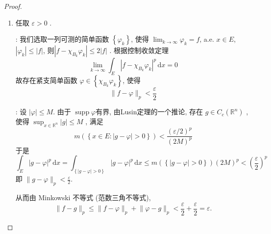 \documentclass[../main.tex]{subfiles}
\begin{document}
\begin{proof}
    \begin{enumerate}
        \item 
        
        任取 \(   \varepsilon > 0  \) .
        
        : 我们选取一列可测的简单函数 \(  \left\{  \varphi _{k} \right\}  \), 使得 \(  \lim_{k\to \infty} \varphi _{k}= f  \), a.e. \(  x \in E  \), \(  \left|  \varphi _{k} \right|\le \left| f \right|    \), 则\(  \left| f- \chi _{B_{k}}\varphi _{k} \right|\le 2\left| f \right|    \) . 根据控制收敛定理 \[
        \lim_{k\to \infty} \int_{E} \left| f- \chi _{B_{k}} \varphi _{k} \right|^{p}\,\mathrm{d} x= 0 
        \] 故存在紧支简单函数 \(   \varphi \in \left\{ \chi _{B_{k}} \varphi _{k} \right\}  \), 使得 \[
        \lVert f - \varphi \rVert_{p} < \frac{ \varepsilon  }{2 } 
        \] 
        

        : 设 \(  \left|  \varphi  \right|\le M   \). 由于 \(  \operatorname{supp} \varphi   \)有界,  由Lusin定理的一个推论, 存在 \(  g\in C_{c}\left( \mathbb{R} ^{n} \right)   \) , 使得 \(  \sup _{x\in \mathbb{R}^{n} }\left| g \right|\le M  \) , 满足 \[
        m\left( \left\{ x \in E : \left| g- \varphi  \right|>  0 \right\} \right)< \frac{ (\varepsilon/2)^p }{ (2M)^{p} }  
        \]于是 \[
        \int_{E}\left| g- \varphi  \right|^{p}\,\mathrm{d} x= \int_{\left\{ \left| g- \varphi  \right|> 0  \right\}} \left| g- \varphi  \right|^{p}\,\mathrm{d} x\le m\left( \left\{ \left| g- \varphi  \right|> 0  \right\} \right)  \left( 2M \right)^{p}< \left( \frac{ \varepsilon  }{2 } \right)^p   
        \]
        即 \( \lVert g - \varphi \rVert_{p} < \frac{\varepsilon}{2} \).

        从而由 Minkowski 不等式 (范数三角不等式),
        \[
        \lVert f - g \rVert_{p} \le \lVert f - \varphi \rVert_{p} + \lVert \varphi - g \rVert_{p} < \frac{\varepsilon}{2} + \frac{\varepsilon}{2} = \varepsilon.
        \]


\end{enumerate}
\end{proof}
\end{document}
